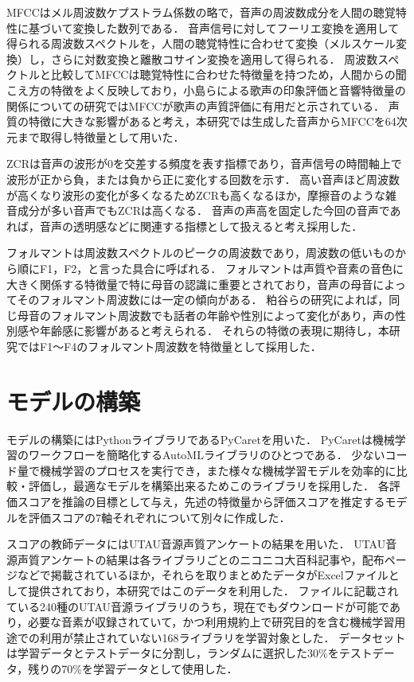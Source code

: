 MFCCはメル周波数ケプストラム係数の略で，音声の周波数成分を人間の聴覚特性に基づいて変換した数列である．
音声信号に対してフーリエ変換を適用して得られる周波数スペクトルを，人間の聴覚特性に合わせて変換（メルスケール変換）し，さらに対数変換と離散コサイン変換を適用して得られる．
周波数スペクトルと比較してMFCCは聴覚特性に合わせた特徴量を持つため，人間からの聞こえ方の特徴をよく反映しており，小島らによる歌声の印象評価と音響特徴量の関係についての研究\cite{mfcc_cute}ではMFCCが歌声の声質評価に有用だと示されている．
声質の特徴に大きな影響があると考え，本研究では生成した音声からMFCCを64次元まで取得し特徴量として用いた．

ZCRは音声の波形が0を交差する頻度を表す指標であり，音声信号の時間軸上で波形が正から負，または負から正に変化する回数を示す．
高い音声ほど周波数が高くなり波形の変化が多くなるためZCRも高くなるほか，摩擦音のような雑音成分が多い音声でもZCRは高くなる．
音声の声高を固定した今回の音声であれば，音声の透明感などに関連する指標として扱えると考え採用した．

フォルマントは周波数スペクトルのピークの周波数であり，周波数の低いものから順にF1，F2，と言った具合に呼ばれる．
フォルマントは声質や音素の音色に大きく関係する特徴量で特に母音の認識に重要とされており，音声の母音によってそのフォルマント周波数には一定の傾向がある．
粕谷らの研究によれば，同じ母音のフォルマント周波数でも話者の年齢や性別によって変化があり\cite{formant}，声の性別感や年齢感に影響があると考えられる．
それらの特徴の表現に期待し，本研究ではF1〜F4のフォルマント周波数を特徴量として採用した．

\section{モデルの構築}
\label{sec:model}

モデルの構築にはPythonライブラリであるPyCaretを用いた．
PyCaretは機械学習のワークフローを簡略化するAutoMLライブラリのひとつである．
少ないコード量で機械学習のプロセスを実行でき，また様々な機械学習モデルを効率的に比較・評価し，最適なモデルを構築出来るためこのライブラリを採用した．
各評価スコアを推論の目標として与え，先述の特徴量から評価スコアを推定するモデルを評価スコアの7軸それぞれについて別々に作成した．

スコアの教師データにはUTAU音源声質アンケートの結果を用いた．
UTAU音源声質アンケートの結果は各ライブラリごとのニコニコ大百科記事や，配布ページなどで掲載されているほか，それらを取りまとめたデータがExcelファイルとして提供されており，本研究ではこのデータを利用した．
ファイルに記載されている240種のUTAU音源ライブラリのうち，現在でもダウンロードが可能であり，必要な音素が収録されていて，かつ利用規約上で研究目的を含む機械学習用途での利用が禁止されていない168ライブラリを学習対象とした．
データセットは学習データとテストデータに分割し，ランダムに選択した30\%をテストデータ，残りの70\%を学習データとして使用した．

